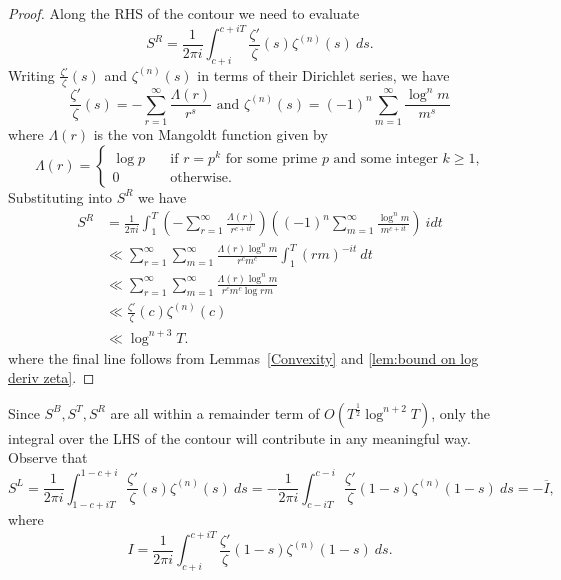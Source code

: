 \documentclass[12pt,a4paper,reqno]{amsart}
\theoremstyle{remark}
\numberwithin{equation}{section}
\begin{document}
\begin{proof}
Along the RHS of the contour we need to evaluate
\[
S^R = \frac{1}{2 \pi i} \int_{c+i}^{c+iT} \frac{\zeta '}{\zeta}(s) \zeta ^{(n)} (s) \ ds.
\]
Writing $\frac{\zeta '}{\zeta}(s)$ and $\zeta ^{(n)} (s)$ in terms of their Dirichlet series, we have
\begin{equation}
\frac{\zeta '}{\zeta}(s) = -\sum_{r=1}^{\infty} \frac{\Lambda(r)}{r^s} \text{ and } \zeta ^{(n)} (s)= (-1)^n \sum _{m=1}^{\infty} \frac{\log ^n m}{m^s} \label{eq:Dirichlet Series}
\end{equation}
where $\Lambda (r)$ is the von Mangoldt function given by
\begin{equation*}
\Lambda(r) = \begin{cases}
       \log p  \quad &\text{if $r = p^k$ for some prime $p$ and some integer $k \geq 1$,} \\
        0 \quad &\text{otherwise.}
    \end{cases}
\end{equation*}
Substituting into $S^R$ we have
\begin{align*}
S^R & = \frac{1}{2 \pi i} \int_{1}^{T} \left( -\sum_{r=1}^{\infty} \frac{\Lambda(r)}{r^{c +it}} \right) \left( (-1)^n \sum _{m=1}^{\infty} \frac{\log ^n m}{m^{c +it}} \right) \ i dt \\
&\ll \sum_{r=1}^{\infty} \sum _{m=1}^{\infty} \frac{\Lambda(r) \log^n m}{r^c m^c} \int_{1}^{T} (rm)^{-it} \ dt \\
&\ll \sum_{r=1}^{\infty} \sum _{m=1}^{\infty} \frac{\Lambda(r) \log^n m}{r^c m^c \log rm} \\
&\ll \frac{\zeta '}{\zeta}(c) \zeta ^{(n)} (c) \\
&\ll \log ^{n+3} T.
\end{align*}
where the final line follows from Lemmas~\ref{Convexity} and \ref{lem:bound on log deriv zeta}.
\end{proof}


Since $S^B, S^T, S^R$ are all within a remainder term of $O(T^{\frac{1}{2}} \log^{n+2} T)$, only the integral over the LHS of the contour will contribute in any meaningful way. Observe that
\[
S^L = \frac{1}{2 \pi i} \int_{1-c+iT}^{1-c+i} \frac{\zeta '}{\zeta}(s) \zeta ^{(n)} (s) \ ds = -\frac{1}{2 \pi i} \int_{c-iT}^{c-i} \frac{\zeta '}{\zeta}(1-s) \zeta ^{(n)} (1-s) \ ds = - \overline{I},
\]
where
\begin{equation}
I = \frac{1}{2 \pi i} \int_{c+i}^{c+iT} \frac{\zeta '}{\zeta}(1-s) \zeta ^{(n)} (1-s) \ ds. \label{eq:I}
\end{equation}
\end{document}
